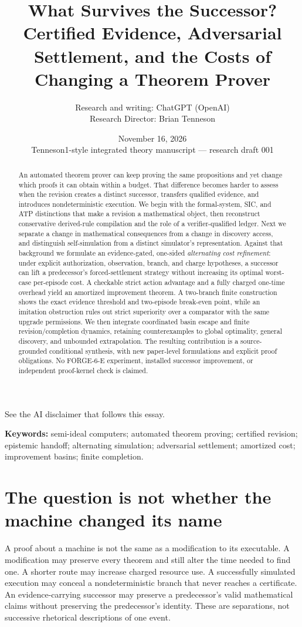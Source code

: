 \documentclass[11pt,letterpaper]{article}
\title{\bfseries What Survives the Successor?\\[4pt]
\large Certified Evidence, Adversarial Settlement, and the Costs of Changing a Theorem Prover}
\author{Research and writing: ChatGPT (OpenAI)\\[3pt]
\small Research Director: Brian Tenneson}
\date{November 16, 2026\\\small Tenneson1-style integrated theory manuscript --- research draft 001}
\theoremstyle{definition}
\theoremstyle{remark}
\begin{document}
\maketitle
\begin{center}\normalsize See the AI disclaimer that follows this essay.\end{center}
\begin{abstract}
An automated theorem prover can keep proving the same propositions and yet change which proofs it can obtain within a budget. That difference becomes harder to assess when the revision creates a distinct successor, transfers qualified evidence, and introduces nondeterministic execution. We begin with the formal-system, SIC, and ATP distinctions that make a revision a mathematical object, then reconstruct conservative derived-rule compilation and the role of a verifier-qualified ledger. Next we separate a change in mathematical consequences from a change in discovery access, and distinguish self-simulation from a distinct simulator's representation. Against that background we formulate an evidence-gated, one-sided \emph{alternating cost refinement}: under explicit authorization, observation, branch, and charge hypotheses, a successor can lift a predecessor's forced-settlement strategy without increasing its optimal worst-case per-episode cost. A checkable strict action advantage and a fully charged one-time overhead yield an amortized improvement theorem. A two-branch finite construction shows the exact evidence threshold and two-episode break-even point, while an imitation obstruction rules out strict superiority over a comparator with the same upgrade permissions. We then integrate coordinated basin escape and finite revision/completion dynamics, retaining counterexamples to global optimality, general discovery, and unbounded extrapolation. The resulting contribution is a source-grounded conditional synthesis, with new paper-level formulations and explicit proof obligations. No FORGE-6-E experiment, installed successor improvement, or independent proof-kernel check is claimed.
\end{abstract}
\noindent\textbf{Keywords:} semi-ideal computers; automated theorem proving; certified revision; epistemic handoff; alternating simulation; adversarial settlement; amortized cost; improvement basins; finite completion.
\tableofcontents

\section{The question is not whether the machine changed its name}
A proof about a machine is not the same as a modification to its executable. A modification may preserve every theorem and still alter the time needed to find one. A shorter route may increase charged resource use. A successfully simulated execution may conceal a nondeterministic branch that never reaches a certificate. An evidence-carrying successor may preserve a predecessor's valid mathematical claims without preserving the predecessor's identity. These are separations, not successive rhetorical descriptions of one event.
\end{document}
